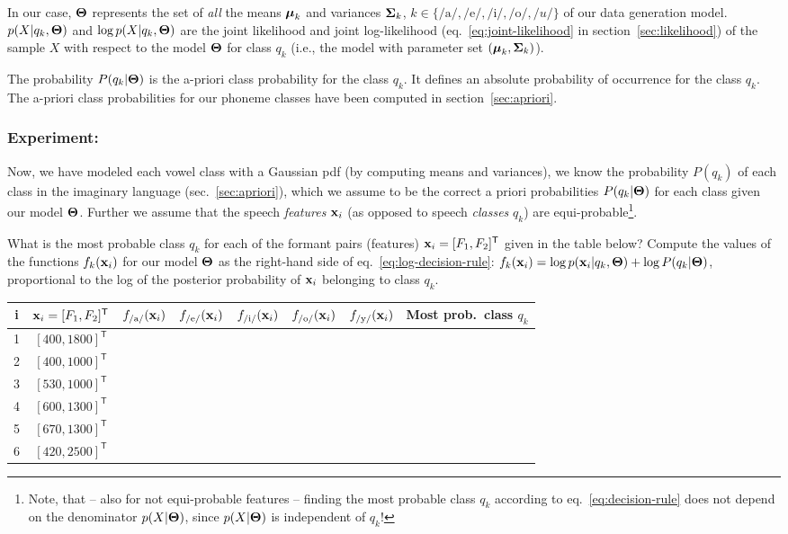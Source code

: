 \documentclass[a4paper]{article}
\newcommand{\trn}{^{\mathsf T}} %
\newcommand{\xv}{\ensuremath\mathbf{x}}  %
\newcommand{\muv}{\ensuremath\boldsymbol{\mu}}  %
\newcommand{\Sm}{\ensuremath\boldsymbol{\Sigma}}  %
\newcommand{\Tm}{\ensuremath\boldsymbol{\Theta}}  %
\begin{document}
In our case, $\Tm$ represents the set of \emph{all} the means $\muv_k$
and variances $\Sm_k$, $k \in
\{\text{/a/},\text{/e/},\text{/i/},\text{/o/},/u/\}$ of our data
generation model.  $p(X|q_k,\Tm)$ and $\log p(X|q_k,\Tm)$ are the
joint likelihood and joint log-likelihood
(eq.~\ref{eq:joint-likelihood} in section~\ref{sec:likelihood}) of the
sample $X$ with respect to the model $\Tm$ for class $q_k$ (i.e., the
model with parameter set $(\muv_k,\Sm_k)$).

The probability $P(q_k|\Tm)$ is the a-priori class probability for the
class $q_k$. It defines an absolute probability of occurrence for the
class $q_k$. The a-priori class probabilities for our phoneme classes
have been computed in section~\ref{sec:apriori}.


\subsubsection{Experiment:}
Now, we have modeled each vowel class with a Gaussian pdf (by
computing means and variances), we know the probability $P(q_k)$ of
each class in the imaginary language (sec.~\ref{sec:apriori}), which
we assume to be the correct a priori probabilities $P(q_k|\Tm)$ for
each class given our model $\Tm$.  Further we assume that the speech
\emph{features} $\xv_i$ (as opposed to speech {\em classes} $q_k$) are
equi-probable\footnote{Note, that -- also for not equi-probable
  features -- finding the most probable class $q_k$ according to
  eq.~\ref{eq:decision-rule} does not depend on the denominator
  $p(X|\Tm)$, since $p(X|\Tm)$ is independent of $q_k$!}.

What is the most probable class $q_k$ for each of the formant pairs
(features) $\xv_i=[F_1,F_2]\trn$ given in the table below?  Compute
the values of the functions $f_k(\xv_i)$ for our model $\Tm$ as the
right-hand side of eq.~\ref{eq:log-decision-rule}: $f_k(\xv_i) = \log
p(\xv_i|q_k,\Tm) + \log P(q_k|\Tm)$, proportional to the log of the
posterior probability of $\xv_i$ belonging to class $q_k$.

\medskip
\noindent
\begin{center}
  \renewcommand{\arraystretch}{1.5}
  \setlength{\tabcolsep}{0.12in}
  \begin{tabular}{|c|c|c|c|c|c|c|c|} \hline
    i & \small$\xv_i=[F_1,F_2]\trn$ &
    \small $f_{\text{/a/}}(\xv_i)$ &
    \small $f_{\text{/e/}}(\xv_i)$ &
    \small $f_{\text{/i/}}(\xv_i)$ &
    \small $f_{\text{/o/}}(\xv_i)$ &
    \small $f_{\text{/y/}}(\xv_i)$ & 
    Most prob.\ class $q_k$ \\
    \hline
    1 & $[400,1800]\trn$ & & & & & & \\ \hline
    2 & $[400,1000]\trn$ & & & & & & \\ \hline
    3 & $[530,1000]\trn$ & & & & & & \\ \hline
    4 & $[600,1300]\trn$ & & & & & & \\ \hline
    5 & $[670,1300]\trn$ & & & & & & \\ \hline
    6 & $[420,2500]\trn$ & & & & & & \\ \hline
  \end{tabular}
\end{center}
\end{document}
